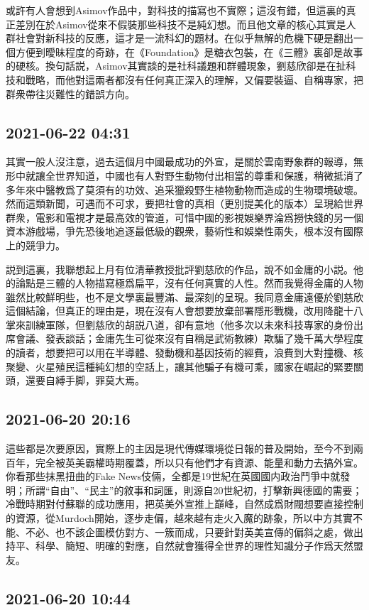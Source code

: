 \documentclass[twocolumn]{ctexart}
\begin{document}
或許有人會想到Asimov作品中，對科技的描寫也不實際；這沒有錯，但這裏的真正差別在於Asimov從來不假裝那些科技不是純幻想。而且他文章的核心其實是人群社會對新科技的反應，這才是一流科幻的題材。在似乎無解的危機下硬是翻出一個方便到曖昧程度的奇跡，在《Foundation》是糖衣包裝，在《三體》裏卻是故事的硬核。換句話説，Asimov其實談的是社科議題和群體現象，劉慈欣卻是在扯科技和戰略，而他對這兩者都沒有任何真正深入的理解，又偏要裝逼、自稱專家，把群衆帶往災難性的錯誤方向。
\subsection*{2021-06-22 04:31}

其實一般人沒注意，過去這個月中國最成功的外宣，是關於雲南野象群的報導，無形中就讓全世界知道，中國也有人對野生動物付出相當的尊重和保護，稍微抵消了多年來中醫教爲了莫須有的功效、追采獵殺野生植物動物而造成的生物環境破壞。
然而這類新聞，可遇而不可求，要把社會的真相（更別提美化的版本）呈現給世界群衆，電影和電視才是最高效的管道，可惜中國的影視娛樂界淪爲撈快錢的另一個資本游戲場，爭先恐後地追逐最低級的觀衆，藝術性和娛樂性兩失，根本沒有國際上的競爭力。

説到這裏，我聯想起上月有位清華教授批評劉慈欣的作品，說不如金庸的小説。他的論點是三體的人物描寫極爲扁平，沒有任何真實的人性。然而我覺得金庸的人物雖然比較鮮明些，也不是文學裏最豐滿、最深刻的呈現。我同意金庸遠優於劉慈欣這個結論，但真正的理由是，現在沒有人會想要放棄部署隱形戰機，改用降龍十八掌來訓練軍隊，但劉慈欣的胡説八道，卻有意地（他多次以未來科技專家的身份出席會議、發表談話；金庸先生可從來沒有自稱是武術教練）欺騙了幾千萬大學程度的讀者，想要把可以用在半導體、發動機和基因技術的經費，浪費到大對撞機、核聚變、火星殖民這種純幻想的空話上，讓其他騙子有機可乘，國家在崛起的緊要關頭，還要自縛手脚，罪莫大焉。
\subsection*{2021-06-20 20:16}

這些都是次要原因，實際上的主因是現代傳媒環境從日報的普及開始，至今不到兩百年，完全被英美霸權時期覆蓋，所以只有他們才有資源、能量和動力去搞外宣。你看那些抹黑扭曲的Fake News伎倆，全都是19世紀在英國國内政治鬥爭中就發明；所謂“自由”、“民主”的敘事和詞匯，則源自20世紀初，打擊新興德國的需要；冷戰時期對付蘇聯的成功應用，把英美外宣推上巔峰，自然成爲財閥想要直接控制的資源，從Murdoch開始，逐步走偏，越來越有走火入魔的跡象，所以中方其實不能、不必、也不該企圖模仿對方、一簇而成，只要針對英美宣傳的偏斜之處，做出持平、科學、簡短、明確的對應，自然就會獲得全世界的理性知識分子作爲天然盟友。
\subsection*{2021-06-20 10:44}
\end{document}

